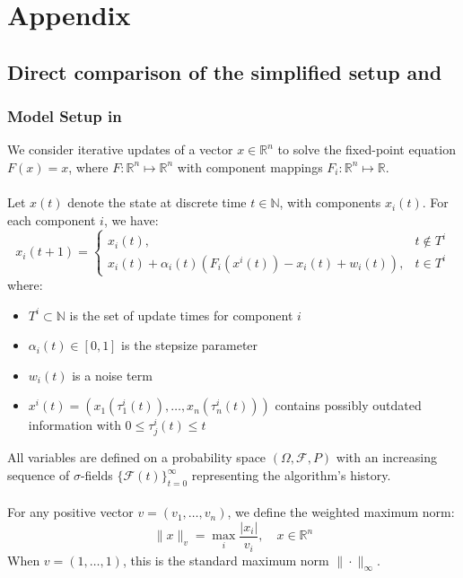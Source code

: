 \section{Appendix}
\subsection{Direct comparison of the simplified setup and \cite{tsitsiklis1994asynchronous}}\label{app:comparison}
\subsubsection{Model Setup in \cite{tsitsiklis1994asynchronous}}

We consider iterative updates of a vector $x \in \mathbb{R}^n$ to solve the fixed-point equation $F(x) = x$, where $F: \mathbb{R}^n \mapsto \mathbb{R}^n$ with component mappings $F_i: \mathbb{R}^n \mapsto \mathbb{R}$.\\
\\
Let $x(t)$ denote the state at discrete time $t \in \mathbb{N}$, with components $x_i(t)$. For each component $i$, we have:
\begin{equation}\label{eq:update_rule_tsi}
x_i(t + 1) = 
\begin{cases}
x_i(t), & t \notin T^i \\
x_i(t) + \alpha_i(t)(F_i(x^i(t)) - x_i(t) + w_i(t)), & t \in T^i
\end{cases}
\end{equation}
where:
\begin{itemize}
\item $T^i \subset \mathbb{N}$ is the set of update times for component $i$
\item $\alpha_i(t) \in [0,1]$ is the stepsize parameter
\item $w_i(t)$ is a noise term
\item $x^i(t) = (x_1(\tau_1^i(t)), \ldots, x_n(\tau_n^i(t)))$ contains possibly outdated information with $0 \leq \tau_j^i(t) \leq t$
\end{itemize}
All variables are defined on a probability space $(\Omega, \mathcal{F}, P)$ with an increasing sequence of $\sigma$-fields $\{\mathcal{F}(t)\}_{t=0}^{\infty}$ representing the algorithm's history.\\
\\
For any positive vector $v = (v_1, \ldots, v_n)$, we define the weighted maximum norm:
\begin{equation*}
\|x\|_v = \max_i \frac{|x_i|}{v_i}, \quad x \in \mathbb{R}^n
\end{equation*}
When $v = (1,\ldots,1)$, this is the standard maximum norm $\|\cdot\|_{\infty}$.
